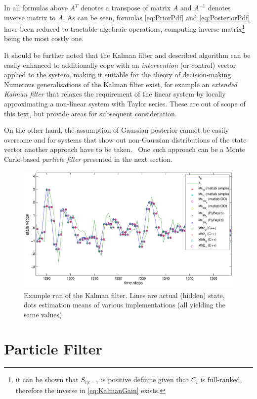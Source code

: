In all formulas above \(A^T\) denotes a transpose of matrix \(A\) and \(A^{-1}\) denotes inverse
matrix to \(A\). As can be seen, formulas \eqref{eq:PriorPdf} and \eqref{eq:PosteriorPdf} have
been reduced to tractable algebraic operations, computing inverse matrix\footnote{it can be shown
that \(S_{t|t-1}\) is positive definite given that \(C_t\) is full-ranked,
therefore the inverse in \eqref{eq:KalmanGain} exists.} being the most costly one.

It should be further noted that the Kalman filter and described algorithm can be easily enhanced to
additionally cope with an \emph{intervention} (or control) vector applied to the system, making it
suitable for the theory of decision-making. Numerous generalisations of the Kalman filter exist, for
example an \emph{extended Kalman filter} that relaxes the requirement of the linear system by locally
approximating a non-linear system with Taylor series. These are out of scope of this
text, but provide areas for subsequent consideration.

On the other hand, the assumption of Gaussian posterior {\pdf} cannot be easily overcome and for
systems that show out non-Gaussian distributions of the state vector another approach have to be
taken.~\cite{AruMasGor:02} One such approach can be a Monte Carlo-based \emph{particle filter}
presented in the next section.

\begin{figure}[h]
	\centering
	\includegraphics[width=\textwidth,keepaspectratio=true]{KF.pdf}
	\caption[Example run of the Kalman filter]{Example run of the Kalman filter. Lines are actual
	(hidden) state, dots estimation means of various implementations (all yielding the same values).}
	\label{fig:KF}
\end{figure}

\section{Particle Filter} \label{sec:ParticleFilter}

